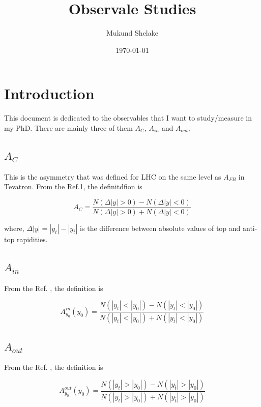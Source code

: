 \documentclass{article}
\title{Observale Studies}
\author{Mukund Shelake}
\date{\today}
\begin{document}


\maketitle

\section{Introduction}
This document is dedicated to the observables that I want to study/measure in my PhD.
There are mainly three of them $A_C$, $A_{in}$ and $A_{out}$.

\subsection{$A_C$}
This is the asymmetry that was defined for LHC on the same level as $A_{FB}$ in Tevatron.
From the Ref.1, the definitdfion is 

$$A_C = \frac{N(\Delta|y| > 0) - N(\Delta|y| < 0)}{N(\Delta|y| > 0) + N(\Delta|y| < 0)}$$

where, $\Delta|y| = |y_t| - |y_{\bar{t}}|$ is the difference between absolute values of top and anti-top rapidities.



\subsection{$A_{in}$}
From the Ref. \cite{K_hn_2012}, the definition is 

$$A^{in}_{y_0} (y_{0}) = \frac{N(|y_t| < |y_{0}|) - N(|y_{\bar{t}}| < |y_{0}|)}{N(|y_t| < |y_{0}|) + N(|y_{\bar{t}}| < |y_{0}|)}$$


\subsection{$A_{out}$}
From the Ref. \cite{K_hn_2012}, the definition is 

$$A^{out}_{y_0} (y_{0}) = \frac{N(|y_t| > |y_{0}|) - N(|y_{\bar{t}}| > |y_{0}|)}{N(|y_t| > |y_{0}|) + N(|y_{\bar{t}}| > |y_{0}|)}$$



\end{document}
